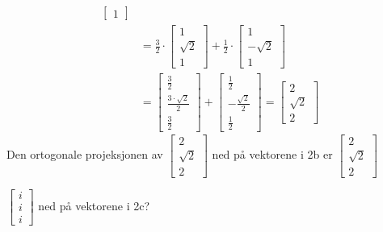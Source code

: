\documentclass[11pt, a4paper, norsk]{NTNUoving}
\begin{document}
\begin{oppgave}
\begin{punkt}
\begin{align*}
\begin{bmatrix}
                1
            \end{bmatrix}
            \\
            &= \frac{3}{2} \cdot \begin{bmatrix}
                1 \\
                \sqrt{2} \\
                1
            \end{bmatrix} + \frac{1}{2} \cdot \begin{bmatrix}
                1 \\
                -\sqrt{2} \\
                1
            \end{bmatrix}
            \\
            &= \begin{bmatrix}
                \frac{3}{2} \\
                \frac{3 \cdot \sqrt{2}}{2} \\
                \frac{3}{2}
            \end{bmatrix} + \begin{bmatrix}
                \frac{1}{2} \\
                -\frac{\sqrt{2}}{2} \\
                \frac{1}{2}
            \end{bmatrix} = \begin{bmatrix}
                2 \\
                \sqrt{2} \\
                2
            \end{bmatrix}
        \end{align*}
        Den ortogonale projeksjonen av $\begin{bmatrix}
            2 \\
            \sqrt{2} \\
            2
        \end{bmatrix}$ ned på vektorene i 2b er $\begin{bmatrix}
            2 \\
            \sqrt{2} \\
            2
        \end{bmatrix}$
       \end{punkt}
       \begin{punkt}
           $\begin{bmatrix}
               i \\
               i \\
               i
           \end{bmatrix}$ ned på vektorene i 2c?
           

\end{punkt}
\end{oppgave}
\end{document}
